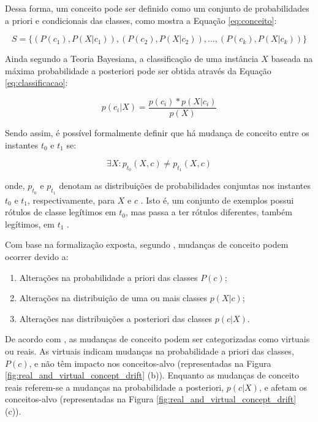 \documentclass[qual, classic, a4paper]{ufbathesis}
\begin{document}
Dessa forma, um conceito pode ser definido como um conjunto de probabilidades a priori e condicionais das classes, como mostra a Equação \ref{eq:conceito}:

\begin{equation} \label{eq:conceito}
    S = \{(P(c_1), P(X|c_1)), (P(c_2), P(X|c_2)), ..., (P(c_k), P(X|c_k))\}
\end{equation}

Ainda segundo a Teoria Bayesiana, a classificação de uma instância $X$ baseada na máxima probabilidade a posteriori pode ser obtida através da Equação \ref{eq:classificacao}:

\begin{equation} \label{eq:classificacao}
    p(c_i|X) = \frac{p(c_i) * p(X|c_i)}{p(X)}
\end{equation}

Sendo assim, é possível formalmente definir que há mudança de conceito entre os instantes $t_0$ e $t_1$ se:

\begin{equation} \label{eq:3}
    {\exists}X : p_{t_0}(X, c) \ne p_{t_1}(X, c)
\end{equation}

onde, $p_{t_0}$ e $p_{t_1}$ denotam as distribuições de probabilidades conjuntas nos instantes $t_0$ e $t_1$, respectivamente, 
para $X$ e $c$ \cite{Gama:2014:SCD:2597757.2523813}. 
Isto é, um conjunto de exemplos possui rótulos de classe legítimos em $t_0$, mas passa a ter rótulos diferentes, também legítimos, em $t_1$ \cite{Kolter:2007:DWM:1314498.1390333}.

Com base na formalização exposta, segundo \cite{Zliobaite:2010}, mudanças de conceito podem ocorrer devido a:

\begin{enumerate}
    \item Alterações na probabilidade a priori das classes $P(c)$;
    \item Alterações na distribuição de uma ou mais classes $p(X|c)$;
    \item Alterações nas distribuições a posteriori das classes $p(c|X)$.
\end{enumerate}

De acordo com \cite{Zliobaite:2010, Gama:2014:SCD:2597757.2523813}, as mudanças de conceito podem ser categorizadas como virtuais ou reais.
As virtuais indicam mudanças na probabilidade a priori das classes, $P(c)$, e não têm impacto nos conceitos-alvo (representadas na Figura \ref{fig:real_and_virtual_concept_drift} (b)).
Enquanto as mudanças de conceito reais referem-se a mudanças na probabilidade a posteriori, $p(c|X)$, e afetam os conceitos-alvo (representadas na Figura \ref{fig:real_and_virtual_concept_drift} (c)).
\end{document}
